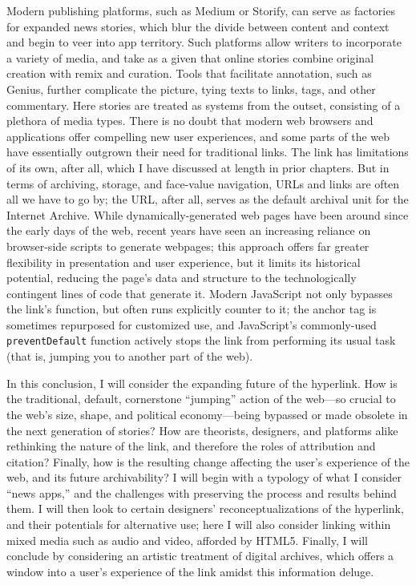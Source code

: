 Modern publishing platforms, such as Medium or Storify, can serve as factories for expanded news stories, which blur the divide between content and context and begin to veer into app territory. Such platforms allow writers to incorporate a variety of media, and take as a given that online stories combine original creation with remix and curation. Tools that facilitate annotation, such as Genius, further complicate the picture, tying texts to links, tags, and other commentary. Here stories are treated as systems from the outset, consisting of a plethora of media types. There is no doubt that modern web browsers and applications offer compelling new user experiences, and some parts of the web have essentially outgrown their need for traditional links. The link has limitations of its own, after all, which I have discussed at length in prior chapters. But in terms of archiving, storage, and face-value navigation, URLs and links are often all we have to go by; the URL, after all, serves as the default archival unit for the Internet Archive. While dynamically-generated web pages have been around since the early days of the web, recent years have seen an increasing reliance on browser-side scripts to generate webpages; this approach offers far greater flexibility in presentation and user experience, but it limits its historical potential, reducing the page's data and structure to the technologically contingent lines of code that generate it. Modern JavaScript not only bypasses the link's function, but often runs explicitly counter to it; the anchor tag is sometimes repurposed for customized use, and JavaScript's commonly-used \texttt{preventDefault} function actively stops the link from performing its usual task (that is, jumping you to another part of the web).

In this conclusion, I will consider the expanding future of the hyperlink. How is the traditional, default, cornerstone ``jumping'' action of the web---so crucial to the web's size, shape, and political economy---being bypassed or made obsolete in the next generation of stories? How are theorists, designers, and platforms alike rethinking the nature of the link, and therefore the roles of attribution and citation? Finally, how is the resulting change affecting the user's experience of the web, and its future archivability? I will begin with a typology of what I consider ``news apps,'' and the challenges with preserving the process and results behind them. I will then look to certain designers' reconceptualizations of the hyperlink, and their potentials for alternative use; here I will also consider linking within mixed media such as audio and video, afforded by HTML5. Finally, I will conclude by considering an artistic treatment of digital archives, which offers a window into a user's experience of the link amidst this information deluge.

